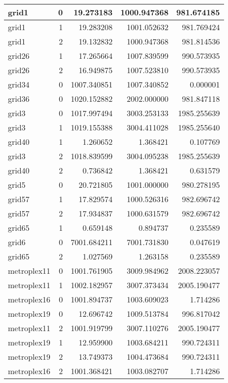 \begin{longtable}{|l|r|r|r|r|}
\endfoot
\hline
\endlastfoot
grid1 & 0 & 19.273183 & 1000.947368 & 981.674185 \\\hline
grid1 & 1 & 19.283208 & 1001.052632 & 981.769424 \\\hline
grid1 & 2 & 19.132832 & 1000.947368 & 981.814536 \\\hline
grid26 & 1 & 17.265664 & 1007.839599 & 990.573935 \\\hline
grid26 & 2 & 16.949875 & 1007.523810 & 990.573935 \\\hline
grid34 & 0 & 1007.340851 & 1007.340852 & 0.000001 \\\hline
grid36 & 0 & 1020.152882 & 2002.000000 & 981.847118 \\\hline
grid3 & 0 & 1017.997494 & 3003.253133 & 1985.255639 \\\hline
grid3 & 1 & 1019.155388 & 3004.411028 & 1985.255640 \\\hline
grid40 & 1 & 1.260652 & 1.368421 & 0.107769 \\\hline
grid3 & 2 & 1018.839599 & 3004.095238 & 1985.255639 \\\hline
grid40 & 2 & 0.736842 & 1.368421 & 0.631579 \\\hline
grid5 & 0 & 20.721805 & 1001.000000 & 980.278195 \\\hline
grid57 & 1 & 17.829574 & 1000.526316 & 982.696742 \\\hline
grid57 & 2 & 17.934837 & 1000.631579 & 982.696742 \\\hline
grid65 & 1 & 0.659148 & 0.894737 & 0.235589 \\\hline
grid6 & 0 & 7001.684211 & 7001.731830 & 0.047619 \\\hline
grid65 & 2 & 1.027569 & 1.263158 & 0.235589 \\\hline
metroplex11 & 0 & 1001.761905 & 3009.984962 & 2008.223057 \\\hline
metroplex11 & 1 & 1002.182957 & 3007.373434 & 2005.190477 \\\hline
metroplex16 & 0 & 1001.894737 & 1003.609023 & 1.714286 \\\hline
metroplex19 & 0 & 12.696742 & 1009.513784 & 996.817042 \\\hline
metroplex11 & 2 & 1001.919799 & 3007.110276 & 2005.190477 \\\hline
metroplex19 & 1 & 12.959900 & 1003.684211 & 990.724311 \\\hline
metroplex19 & 2 & 13.749373 & 1004.473684 & 990.724311 \\\hline
metroplex16 & 2 & 1001.368421 & 1003.082707 & 1.714286 \\\hline

\end{longtable}
